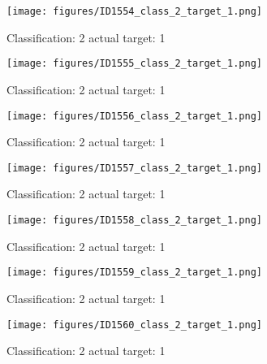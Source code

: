 \begin{figure}[h!]
\begin{center}
\texttt{[image: figures/ID1554\_class\_2\_target\_1.png]}
\end{center}
\caption{ Classification: 2 actual target: 1}
\label{fig:ID1554_class_2_target_1}
\end{figure}
\begin{figure}[h!]
\begin{center}
\texttt{[image: figures/ID1555\_class\_2\_target\_1.png]}
\end{center}
\caption{ Classification: 2 actual target: 1}
\label{fig:ID1555_class_2_target_1}
\end{figure}
\begin{figure}[h!]
\begin{center}
\texttt{[image: figures/ID1556\_class\_2\_target\_1.png]}
\end{center}
\caption{ Classification: 2 actual target: 1}
\label{fig:ID1556_class_2_target_1}
\end{figure}
\begin{figure}[h!]
\begin{center}
\texttt{[image: figures/ID1557\_class\_2\_target\_1.png]}
\end{center}
\caption{ Classification: 2 actual target: 1}
\label{fig:ID1557_class_2_target_1}
\end{figure}
\begin{figure}[h!]
\begin{center}
\texttt{[image: figures/ID1558\_class\_2\_target\_1.png]}
\end{center}
\caption{ Classification: 2 actual target: 1}
\label{fig:ID1558_class_2_target_1}
\end{figure}
\begin{figure}[h!]
\begin{center}
\texttt{[image: figures/ID1559\_class\_2\_target\_1.png]}
\end{center}
\caption{ Classification: 2 actual target: 1}
\label{fig:ID1559_class_2_target_1}
\end{figure}
\begin{figure}[h!]
\begin{center}
\texttt{[image: figures/ID1560\_class\_2\_target\_1.png]}
\end{center}
\caption{ Classification: 2 actual target: 1}
\label{fig:ID1560_class_2_target_1}
\end{figure}
